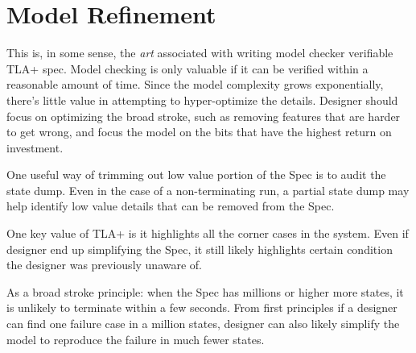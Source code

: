 \section{Model Refinement}

This is, in some sense, the \textit{art} associated with writing model checker
verifiable TLA+ spec. Model checking is only valuable if it can be verified
within a reasonable amount of time. Since the model complexity grows
exponentially, there's little value in attempting to hyper-optimize the details.
Designer should focus on optimizing the broad stroke, such as removing features 
that are harder to get wrong, and focus the model on the bits that have the
highest return on investment.\newline

One useful way of trimming out low value portion of the Spec is to audit the
state dump. Even in the case of a non-terminating run, a partial state dump may
help identify low value details that can be removed from the Spec.\newline

One key value of TLA+ is it highlights all the corner cases in the system. Even
if designer end up simplifying the Spec, it still likely highlights certain
condition the designer was previously unaware of.\newline

As a broad stroke principle: when the Spec has millions or higher more states,
it is unlikely to terminate within a few seconds. From first principles if a
designer can find one failure case in a million states, designer can also likely
simplify the model to reproduce the failure in much fewer states.


